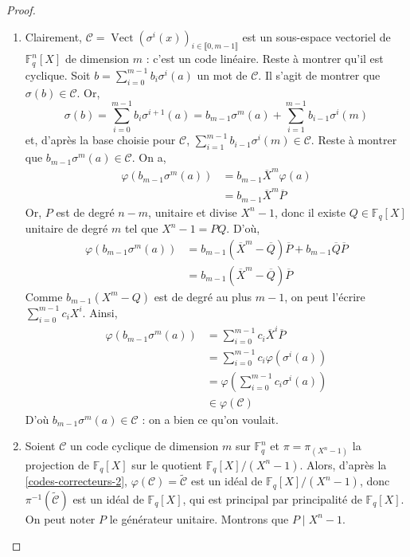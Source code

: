   \begin{proof}
    \begin{enumerate}[label={\bfseries(\roman*)}]
      \item Clairement, $\mathcal{C} = \operatorname{Vect}(\sigma^{i}(x))_{i \in \llbracket 0, m-1 \rrbracket}$ est un sous-espace vectoriel de $\mathbb{F}_q^n[X]$ de dimension $m$ : c'est un code linéaire. Reste à montrer qu'il est cyclique. Soit $b = \sum_{i=0}^{m-1} b_i \sigma^i(a)$ un mot de $\mathcal{C}$. Il s'agit de montrer que $\sigma(b) \in \mathcal{C}$. Or,
      \[ \sigma(b) = \sum_{i=0}^{m-1} b_i \sigma^{i+1}(a) = b_{m-1} \sigma^m(a) + \sum_{i=1}^{m-1} b_{i-1} \sigma^i(m) \]
      et, d'après la base choisie pour $\mathcal{C}$, $\sum_{i=1}^{m-1} b_{i-1} \sigma^i(m) \in \mathcal{C}$. Reste à montrer que $b_{m-1} \sigma^m(a) \in \mathcal{C}$. On a,
      \begin{align*}
        \varphi(b_{m-1} \sigma^m(a)) &= b_{m-1} \overline{X}^m \varphi(a) \\
        &= b_{m-1} \overline{X}^m \overline{P}
      \end{align*}
      Or, $P$ est de degré $n-m$, unitaire et divise $X^n - 1$, donc il existe $Q \in \mathbb{F}_q[X]$ unitaire de degré $m$ tel que $X^n - 1 = PQ$. D'où,
      \begin{align*}
        \varphi(b_{m-1} \sigma^m(a)) &= b_{m-1} (\overline{X}^m - \overline{Q})\overline{P} + b_{m-1}\overline{Q}\overline{P} \\
        &= b_{m-1} (\overline{X}^m - \overline{Q}) \overline{P}
      \end{align*}
      Comme $b_{m-1} (X^m - Q)$ est de degré au plus $m-1$, on peut l'écrire $\sum_{i=0}^{m-1} c_i X^i$. Ainsi,
      \begin{align*}
        \varphi(b_{m-1} \sigma^m(a)) &= \sum_{i=0}^{m-1} c_i \overline{X}^i \overline{P} \\
        &= \sum_{i=0}^{m-1} c_i \varphi(\sigma^i(a)) \\
        &= \varphi \left( \sum_{i=0}^{m-1} c_i \sigma^i(a) \right) \\
        &\in \varphi(\mathcal{C})
      \end{align*}
      D'où $b_{m-1} \sigma^m(a) \in \mathcal{C}$ : on a bien ce qu'on voulait.
      \item Soient $\mathcal{C}$ un code cyclique de dimension $m$ sur $\mathbb{F}_q^n$ et $\pi = \pi_{(X^n-1)}$ la projection de $\mathbb{F}_q[X]$ sur le quotient $\mathbb{F}_q[X]/(X^n-1)$. Alors, d'après la \cref{codes-correcteurs-2}, $\varphi(\mathcal{C}) = \widetilde{\mathcal{C}}$ est un idéal de $\mathbb{F}_q[X]/(X^n-1)$, donc $\pi^{-1}(\widetilde{\mathcal{C}})$ est un idéal de $\mathbb{F}_q[X]$, qui est principal par principalité de $\mathbb{F}_q[X]$. On peut noter $P$ le générateur unitaire. Montrons que $P \mid X^n - 1$.

\end{enumerate}
\end{proof}
